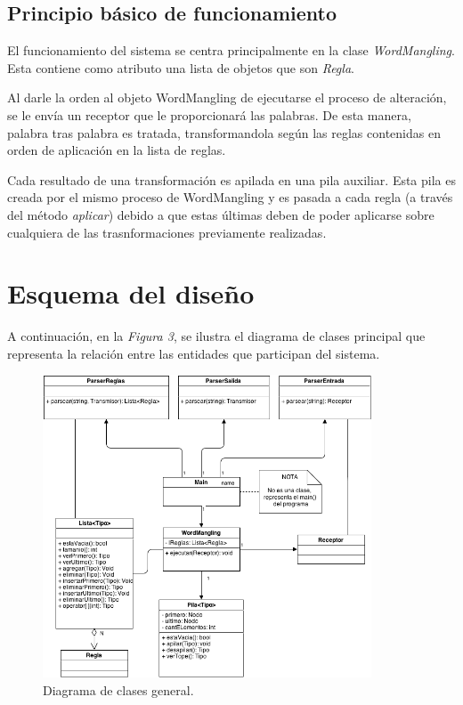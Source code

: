 \documentclass{article}
\begin{document}
\subsection{Principio básico de funcionamiento}

	El funcionamiento del sistema se centra principalmente en la clase \textit{WordMangling}. Esta contiene como atributo una lista de objetos que son \textit{Regla}.
	\par
	Al darle la orden al objeto WordMangling de ejecutarse el proceso de alteración, se le envía un receptor que le proporcionará las palabras. De esta manera, palabra tras palabra es tratada, transformandola según las reglas contenidas en orden de aplicación en la lista de reglas.
	\par
	Cada resultado de una transformación es apilada en una pila auxiliar. Esta pila es creada por el mismo proceso de WordMangling y es pasada a cada regla (a través del método \textit{aplicar}) debido a que estas últimas deben de poder aplicarse sobre cualquiera de las trasnformaciones previamente realizadas.
\bigskip\medskip


\section{Esquema del diseño}

	A continuación, en la \textit{Figura 3}, se ilustra el diagrama de clases principal que representa la relación entre las entidades que participan del sistema.
\bigskip\bigskip


\begin{figure}[h]
	\centering
	\includegraphics[width=0.87\textwidth]{images/diagrama_1.png}
	\medskip
	\caption{Diagrama de clases general.}
\end{figure}
\end{document}
